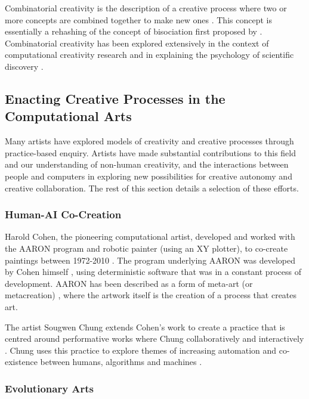 Combinatorial creativity is the description of a creative process where two or more concepts are combined together to make new ones \citep{boden2004creative}. 
This concept is essentially a rehashing of the concept of bisociation first proposed by \cite{koestler1964act}. 
Combinatorial creativity has been explored extensively in the context of computational creativity research \citep{zarraonandia2017using, guzdial2018combinets, guzdial2018combinatorial} and in explaining the psychology of scientific discovery \citep{simonton2021scientific, simonton2022serendipity}.

\subsection{Enacting Creative Processes in the Computational Arts}

Many artists have explored models of creativity and creative processes through practice-based enquiry.
Artists have made substantial contributions to this field and our understanding of non-human creativity, and the interactions between people and computers in exploring new possibilities for creative autonomy and creative collaboration.
The rest of this section details a selection of these efforts.

\subsubsection{Human-AI Co-Creation}

Harold Cohen, the pioneering computational artist, developed and worked with the AARON program and robotic painter (using an XY plotter), to co-create paintings between 1972-2010 \citep{cohen2016harold}. 
The program underlying AARON was developed by Cohen himself \citep{cohen1995further}, using deterministic software that was in a constant process of development. 
AARON has been described as a form of meta-art (or metacreation) \citep{mccorduck1991aaron}, where the artwork itself is the creation of a process that creates art.

The artist Sougwen Chung extends Cohen's work to create a practice that is centred around performative works where Chung collaboratively and interactively \citep{benediktsson2019human}.
Chung uses this practice to explore themes of increasing automation and co-existence between humans, algorithms and machines \citep{voss2021conversation}.

\subsubsection{Evolutionary Arts}

